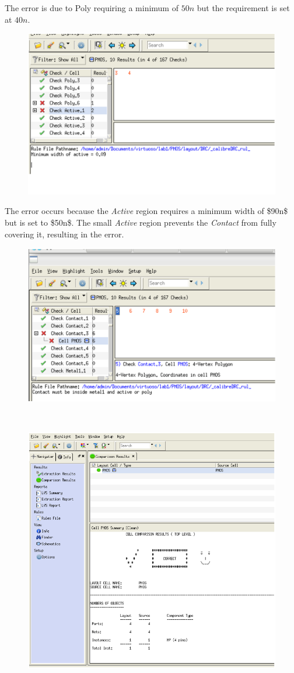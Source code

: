 The error is due to Poly requiring a minimum of $50n$ but the requirement is set at $40n$.

\begin{figure}[H]
	\centering
	\includegraphics[width=.7\linewidth]{sections/pic/EX4_PMOS_DRC_minpoly_50.png}
	\label{f_EX4_PMOS_DRC_minpoly_50}
\end{figure}

The error occurs because the \textit{Active} region requires a minimum width of \$90n\$ but is set to \$50n\$. The small \textit{Active} region prevents the \textit{Contact} from fully covering it, resulting in the error.

\begin{figure}[H]
	\centering
	\includegraphics[width=.7\linewidth]{sections/pic/EX4_PMOS_DRC_minactive_90.png}
	\label{f_EX4_PMOS_DRC_minactive}
\end{figure}

\\

\begin{figure}[H]
	\centering
	\includegraphics[width=.7\linewidth]{sections/pic/EX4_PMOS_LVS.png}
	\label{f_EX4_PMOS_LVS}
\end{figure}